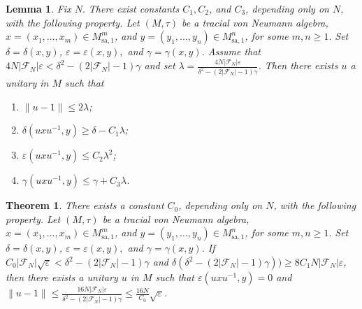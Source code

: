 \documentclass[10pt,a4paper]{amsart}
\newtheorem{lem}{Lemma}
\newtheorem{thm}{Theorem}
\newcommand{\cF}{\mathcal{F}}
\newcommand{\ee}{\varepsilon}
\begin{document}
\begin{lem}\label{lem-main-technical}
    Fix $N.$ There exist constants $C_1,C_2$, and $C_3$, depending only on $N,$ with the following property. Let $(M,\tau)$ be a tracial von Neumann algebra, $x = (x_1,\ldots,x_m)\in M_{\mathrm{sa},1}^m$, and $y = (y_1,\ldots,y_n)\in M_{\mathrm{sa},1}^n$, for some $m,n\ge1.$ Set $\delta = \delta(x,y)$, $\ee= \ee(x,y),$ and $\gamma = \gamma(x,y)$. Assume that $4N|\cF_N|\ee < \delta^2 - (2|\cF_N|-1)\gamma$ and set $\lambda = \frac{4N|\cF_N|\ee}{\delta^2 - (2|\cF_N|-1)\gamma}$. Then there exists $u$ a unitary in $M$ such that 
    \begin{enumerate}
        \item $\|u-1\| \le 2\lambda$;
        \item $\delta(uxu^{-1},y) \ge \delta - C_1\lambda$;
        \item $\ee(uxu^{-1},y)\le C_2\lambda^2$;
        \item $\gamma(uxu^{-1},y) \le \gamma + C_3\lambda$.
    \end{enumerate}
\end{lem} 

\begin{thm}\label{thm-main-technical}
    There exists a constant $C_0$, depending only on $N$, with the following property. Let $(M,\tau)$ be a tracial von Neumann algebra, $x = (x_1,\ldots,x_m)\in M_{\mathrm{sa},1}^m$, and $y = (y_1,\ldots,y_n)\in M_{\mathrm{sa},1}^n$, for some $m,n\ge1.$ Set $\delta = \delta(x,y)$, $\ee= \ee(x,y),$ and $\gamma = \gamma(x,y)$. If $C_0|\cF_N|\sqrt{\ee} < \delta^2 - (2|\cF_N|-1)\gamma$ and $\delta(\delta^2-(2|\cF_N|-1)\gamma)) \ge 8C_1N|\cF_N|\ee$, then  there exists a unitary $u$ in $M$ such that $\ee(uxu^{-1},y)=0$ and $\|u-1\| \le \frac{16N|\cF_N|\ee}{\delta^2 - (2|\cF_N|-1)\gamma} \le \frac{16N}{C_0}\sqrt{\ee}$.
\end{thm}
\end{document}
